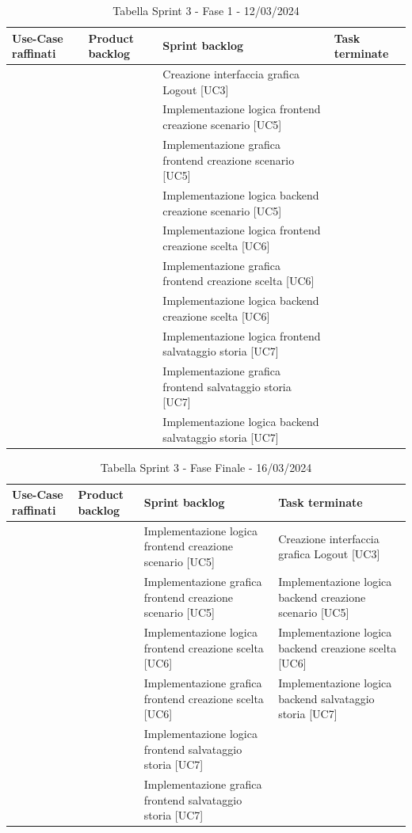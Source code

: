 \documentclass{article}
\begin{document}
\begin{table}[h]
    \centering
    \begin{tabularx}{\textwidth}{|X|X|X|X|}
        \hline
        \bf Use-Case raffinati & \bf Product backlog & \bf Sprint backlog & \bf Task terminate \\
        \hline
        & & Creazione interfaccia grafica Logout [UC3] & \\
        \hline
        & & Implementazione logica frontend creazione scenario [UC5] & \\
        \hline
        & & Implementazione grafica frontend creazione scenario [UC5] & \\
        \hline
        & & Implementazione logica backend creazione scenario [UC5] & \\
        \hline
        & & Implementazione logica frontend creazione scelta [UC6] & \\
        \hline
        & & Implementazione grafica frontend creazione scelta [UC6] & \\
        \hline
        & & Implementazione logica backend creazione scelta [UC6] & \\
        \hline
        & & Implementazione logica frontend salvataggio storia [UC7] & \\
        \hline
        & & Implementazione grafica frontend salvataggio storia [UC7] & \\
        \hline
        & & Implementazione logica backend salvataggio storia [UC7] & \\
        \hline
    \end{tabularx}
    \caption*{Tabella Sprint 3 - Fase 1 - 12/03/2024}
\end{table}

\begin{table}[h]
    \centering
    \begin{tabularx}{\textwidth}{|X|X|X|X|}
        \hline
        \bf Use-Case raffinati & \bf Product backlog & \bf Sprint backlog & \bf Task terminate \\
        \hline
        & & Implementazione logica frontend creazione scenario [UC5] & Creazione interfaccia grafica Logout [UC3] \\
        \hline
        & & Implementazione grafica frontend creazione scenario [UC5] & Implementazione logica backend creazione scenario [UC5] \\
        \hline
        & & Implementazione logica frontend creazione scelta [UC6] & Implementazione logica backend creazione scelta [UC6] \\
        \hline
        & & Implementazione grafica frontend creazione scelta [UC6] & Implementazione logica backend salvataggio storia [UC7] \\
        \hline
        & & Implementazione logica frontend salvataggio storia [UC7] & \\
        \hline
        & & Implementazione grafica frontend salvataggio storia [UC7] & \\
        \hline
    \end{tabularx}
    \caption*{Tabella Sprint 3 - Fase Finale - 16/03/2024}
\end{table}
\end{document}
